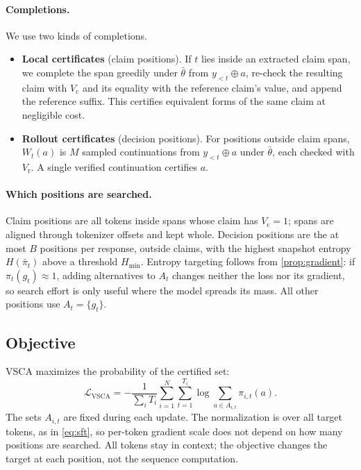 \documentclass{article}
\newcommand{\vsca}{\textsc{VSCA}}
\newcommand{\loss}{\mathcal{L}}
\newcommand{\acc}{A}
\theoremstyle{plain}
\theoremstyle{remark}
\begin{document}
\paragraph{Completions.} We use two kinds of completions.
\begin{itemize}
  \item \textbf{Local certificates} (claim positions). If $t$ lies inside an extracted claim span, we complete the span greedily under $\bar\theta$ from $y_{<t}\oplus a$, re-check the resulting claim with $V_{\mathrm{c}}$ and its equality with the reference claim's value, and append the reference suffix. This certifies equivalent forms of the same claim at negligible cost.
  \item \textbf{Rollout certificates} (decision positions). For positions outside claim spans, $W_t(a)$ is $M$ sampled continuations from $y_{<t}\oplus a$ under $\bar\theta$, each checked with $V_{\mathrm{r}}$. A single verified continuation certifies $a$.
\end{itemize}

\paragraph{Which positions are searched.} Claim positions are all tokens inside spans whose claim has $V_{\mathrm{c}}=1$; spans are aligned through tokenizer offsets and kept whole. Decision positions are the at most $B$ positions per response, outside claims, with the highest snapshot entropy $H(\bar\pi_t)$ above a threshold $H_{\min}$. Entropy targeting follows from \cref{prop:gradient}: if $\pi_t(g_t)\approx 1$, adding alternatives to $\acc_t$ changes neither the loss nor its gradient, so search effort is only useful where the model spreads its mass. All other positions use $\acc_t=\{g_t\}$.

\subsection{Objective}
\vsca{} maximizes the probability of the certified set:
\begin{equation}
 \loss_{\mathrm{VSCA}}=-\frac{1}{\sum_iT_i}\sum_{i=1}^{N}\sum_{t=1}^{T_i}\log \sum_{a\in \acc_{i,t}}\pi_{i,t}(a).
 \label{eq:vsca}
\end{equation}
The sets $\acc_{i,t}$ are fixed during each update. The normalization is over all target tokens, as in \cref{eq:sft}, so per-token gradient scale does not depend on how many positions are searched. All tokens stay in context; the objective changes the target at each position, not the sequence computation.
\end{document}
